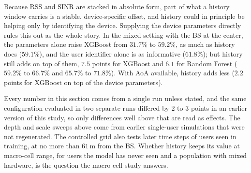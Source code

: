 Because RSS and SINR are stacked in absolute form, part of what a history window carries is a stable, device-specific offset, and history could in principle be helping only by identifying the device. Supplying the device parameters directly rules this out as the whole story. In the mixed setting with the BS at the center, the parameters alone raise XGBoost from $31.7\%$ to $59.2\%$, as much as history does ($59.1\%$), and the user identifier alone is as informative ($61.8\%$); but history still adds on top of them, $7.5$ points for XGBoost and $6.1$ for Random Forest ($59.2\%$ to $66.7\%$ and $65.7\%$ to $71.8\%$). With AoA available, history adds less ($2.2$ points for XGBoost on top of the device parameters).

Every number in this section comes from a single run unless stated, and the same configuration evaluated in two separate runs differed by $2$ to $3$ points in an earlier version of this study, so only differences well above that are read as effects. The depth and scale sweeps above come from earlier single-user simulations that were not regenerated. The controlled grid also tests later time steps of users seen in training, at no more than $61\,\text{m}$ from the BS. Whether history keeps its value at macro-cell range, for users the model has never seen and a population with mixed hardware, is the question the macro-cell study answers.
